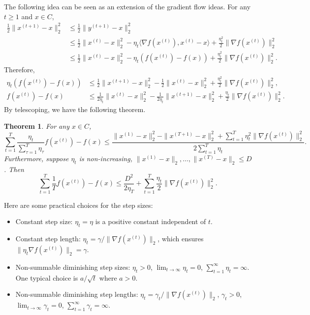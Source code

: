\documentclass[openany]{book}
\newtheorem{theorem}{Theorem}[chapter]
\theoremstyle{definition}
\theoremstyle{remark}
\begin{document}
The following idea can be seen as an extension of the gradient flow ideas. For any $t\ge1$ and $x\in C$,
\begin{align*}
    \frac{1}{2}\|x^{(t+1)}-x\|_2^2 & \le \frac{1}{2}\|y^{(t+1)}-x\|_2^2 \\
     & \le \frac{1}{2}\|x^{(t)}-x\|_2^2-\eta_t \langle\nabla f(x^{(t)}),x^{(t)}-x\rangle+\frac{\eta_t^2}{2}\|\nabla f(x^{(t)})\|_2^2 \\
     & \le \frac{1}{2}\|x^{(t)}-x\|_2^2-\eta_t\left(f(x^{(t)})-f(x)\right)+\frac{\eta_t^2}{2}\|\nabla f(x^{(t)})\|_2^2.
\end{align*}
Therefore,
\begin{align*}
    \eta_t\left(f(x^{(t)})-f(x)\right) & \le \frac{1}{2}\|x^{(t+1)}-x\|_2^2-\frac{1}{2}\|x^{(t)}-x\|_2^2+\frac{\eta_t^2}{2}\|\nabla f(x^{(t)})\|_2^2, \\
    f(x^{(t)})-f(x) & \le \frac{1}{2\eta_t}\|x^{(t)}-x\|_2^2-\frac{1}{2\eta_t}\|x^{(t+1)}-x\|_2^2+\frac{\eta_t}{2}\|\nabla f(x^{(t)})\|_2^2.
\end{align*}
By telescoping, we have the following theorem.
\begin{theorem}\label{thm:GDBound}
    For any $x\in C$,
    \begin{equation*}
        \sum_{t=1}^{T}\frac{\eta_t}{\sum_{\tau=1}^{T}\eta_{\tau}}f(x^{(t)})-f(x)\le\frac{\|x^{(1)}-x\|_2^2-\|x^{(T+1)}-x\|_2^2+\sum_{t=1}^{T}\eta_t^2\|\nabla f(x^{(t)})\|_2^2}{2 \sum_{t=1}^{T}\eta_t}.
    \end{equation*}
    Furthermore, suppose $\eta_t$ is non-increasing, $\|x^{(1)}-x\|_2,\ldots,\|x^{(T)}-x\|_2\le D$. Then
    \begin{equation*}
        \sum_{t=1}^{T}\frac{1}{T}f(x^{(t)})-f(x)\le \frac{D^2}{2\eta_T}+\sum_{t=1}^{T}\frac{\eta_t}{2}\|\nabla f(x^{(t)})\|_2^2.
    \end{equation*}
\end{theorem}
Here are some practical choices for the step sizes:
\begin{itemize}
\item Constant step size: $\eta_t=\eta$ is a positive constant independent of $t$.
\item Constant step length: $\eta_t=\gamma/\|\nabla f(x^{(t)})\|_2$, which ensures $\|\eta_t\nabla f(x^{(t)})\|_2=\gamma$.
\item Non-summable diminishing step sizes: $\eta_t>0$, $\lim_{t\rightarrow\infty}\eta_t=0$, $\sum_{t=1}^{\infty}\eta_t=\infty$. One typical choice is $a/\sqrt{t}$ where $a>0$.
\item Non-summable diminishing step lengths: $\eta_t=\gamma_t/\|\nabla f(x^{(t)})\|_2$, $\gamma_t>0$, $\lim_{t\rightarrow\infty}\gamma_t=0$, $\sum_{t=1}^{\infty}\gamma_t=\infty$.
\end{itemize}
\end{document}

